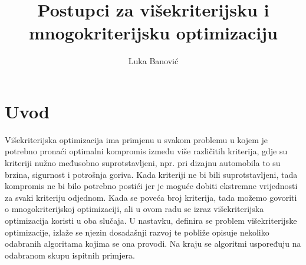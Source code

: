 \documentclass[times, utf8, zavrsni, numeric]{fer}
\begin{document}

\title{Postupci za višekriterijsku i mnogokriterijsku optimizaciju}

\author{Luka Banović}

\maketitle

\izvornik

\zahvala{}

\tableofcontents

\chapter{Uvod}
Višekriterijska optimizacija ima primjenu u svakom problemu u kojem je potrebno pronaći optimalni kompromis između više različitih kriterija, gdje su kriteriji nužno međusobno suprotstavljeni, npr. pri dizajnu automobila to su brzina, sigurnost i potrošnja goriva. Kada kriteriji ne bi bili suprotstavljeni, tada kompromis ne bi bilo potrebno postići jer je moguće dobiti ekstremne vrijednosti za svaki kriteriju odjednom. Kada se poveća broj kriterija, tada možemo govoriti o mnogokriterijskoj optimizaciji, ali u ovom radu se izraz višekriterijska optimizacija koristi u oba slučaja. U nastavku, definira se problem višekriterijske optimizacije, izlaže se njezin dosadašnji razvoj te pobliže opisuje nekoliko odabranih algoritama kojima se ona provodi. Na kraju se algoritmi uspoređuju na odabranom skupu ispitnih primjera.
\end{document}
